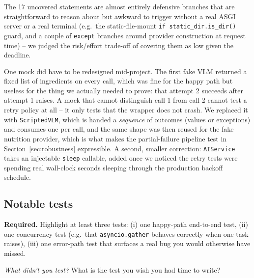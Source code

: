 \documentclass[11pt,a4paper]{article}
\newenvironment{deliverbox}{\begin{deliverboxshown}}{\end{deliverboxshown}}
\newenvironment{probebox}{\begin{probeboxshown}}{\end{probeboxshown}}
\newenvironment{deliverbox}{\setbox0\vbox\bgroup}{\egroup\ignorespacesafterend}
\newenvironment{probebox}{\setbox0\vbox\bgroup}{\egroup\ignorespacesafterend}
\begin{document}
\par\noindent
The 17 uncovered statements are almost entirely defensive branches that are
straightforward to reason about but awkward to trigger without a real ASGI
server or a real terminal (e.g.\ the static-file-mount
\texttt{if static\_dir.is\_dir()} guard, and a couple of \texttt{except}
branches around provider construction at request
time) -- we judged the risk/effort trade-off of covering them as low given
the deadline.

\par\noindent
One mock did have to be redesigned mid-project. The first fake VLM returned
a fixed list of ingredients on every call, which was fine for the happy
path but useless for the thing we actually needed to prove: that attempt 2
succeeds after attempt 1 raises. A mock that cannot distinguish call 1 from
call 2 cannot test a retry policy at all -- it only tests that the wrapper
does not crash. We replaced it with \texttt{ScriptedVLM}, which is handed a
\emph{sequence} of outcomes (values or exceptions) and consumes one per
call, and the same shape was then reused for the fake nutrition provider,
which is what makes the partial-failure pipeline test in
Section~\ref{sec:robustness} expressible. A second, smaller correction:
\texttt{AIService} takes an injectable \texttt{sleep} callable, added once
we noticed the retry tests were spending real wall-clock seconds sleeping
through the production backoff schedule.

\subsection{Notable tests}

\begin{deliverbox}
\textbf{Required.} Highlight at least three tests: (i) one happy-path end-to-end test, (ii) one concurrency test (e.g.\ that \texttt{asyncio.gather} behaves correctly when one task raises), (iii) one error-path test that surfaces a real bug you would otherwise have missed.
\end{deliverbox}

\begin{probebox}
\textit{What didn't you test?} What is the test you wish you had time to write?
\end{probebox}
\end{document}

